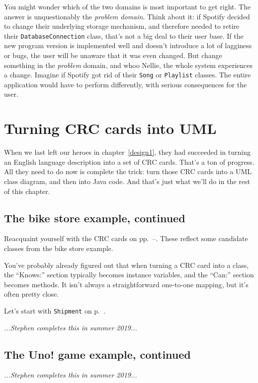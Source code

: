 You might wonder which of the two domains is most important to get right. The
answer is unquestionably the \textit{problem domain}. Think about it: if
Spotify decided to change their underlying storage mechanism, and therefore
needed to retire their \texttt{DatabaseConnection} class, that's not a big deal to their
user base. If the new program version is implemented well and doesn't
introduce a lot of lagginess or bugs, the user will be unaware that it was
even changed. But change something in the \textit{problem} domain, and whoo
Nellie, the whole system experiences a change. Imagine if Spotify got rid of
their \texttt{Song} or \texttt{Playlist} classes. The entire application would
have to perform differently, with serious consequences for the user.


\section{Turning CRC cards into UML}

When we last left our heroes in chapter~\ref{design1}, they had succeeded in
turning an English language description into a set of CRC cards. That's a ton
of progress. All they need to do now is complete the trick: turn those CRC
cards into a UML class diagram, and then into Java code. And that's just what
we'll do in the rest of this chapter.

\subsection{The bike store example, continued}

Reacquaint yourself with the CRC cards on
pp.~\pageref{bikeCRC1}--\pageref{bikeCRC2}. These reflect some candidate
classes from the bike store example.

You've probably already figured out that when turning a CRC card into a class,
the ``Knows:'' section typically becomes instance variables, and the ``Can:''
section becomes methods. It isn't always a straightforward one-to-one mapping,
but it's often pretty close.

Let's start with \texttt{Shipment} on p.~\pageref{bikeCRC1}.

\textit{...Stephen completes this in summer 2019...}

\subsection{The Uno! game example, continued}

\textit{...Stephen completes this in summer 2019...}


